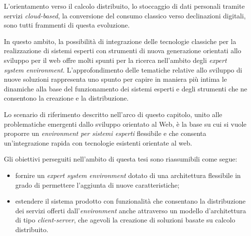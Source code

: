 L'orientamento verso il calcolo distribuito, lo stoccaggio di dati personali tramite servizi \emph{cloud-based}, la conversione del consumo classico verso declinazioni digitali, sono tutti frammenti di questa evoluzione.

In questo ambito, la possibilità di integrazione delle tecnologie classiche per la realizzazione di sistemi esperti con strumenti di nuova generazione orientati allo sviluppo per il web offre molti spunti per la ricerca nell'ambito degli \emph{expert system environment}. L'approfondimento delle tematiche relative allo sviluppo di nuove soluzioni rappresenta uno spunto per capire in maniera più intima le dinamiche alla base del funzionamento dei sistemi esperti e degli strumenti che ne consentono la creazione e la distribuzione.



Lo scenario di riferimento descritto nell'arco di questo capitolo, unito alle problematiche emergenti dallo sviluppo orientato al Web, è la base su cui si vuole proporre un \emph{environment per sistemi esperti} flessibile e che consenta un'integrazione rapida con tecnologie esistenti orientate al web.

Gli obiettivi perseguiti nell'ambito di questa tesi sono riassumibili come segue:
\begin{itemize}
	\item fornire un \emph{expert system environment} dotato di una architettura flessibile in grado di permettere l'aggiunta di nuove caratteristiche;
	\item estendere il sistema prodotto con funzionalità che consentano la distribuzione dei servizi offerti dall'\emph{environment} anche attraverso un modello d'architettura di tipo \emph{client-server}, che agevoli la creazione di soluzioni basate su calcolo distribuito.
\end{itemize}



